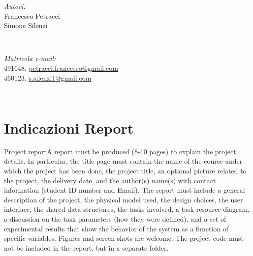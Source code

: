 \begin{titlepage}
	\vspace*{2 cm}
	\begin{minipage}{0.48\textwidth}
		\begin{flushleft}
			\textit{Autori:}\\
			Francesco Petracci\\
			Simone Silenzi
		\end{flushleft}
	\end{minipage}~
	\begin{minipage}{0.48\textwidth}
		\begin{flushright}
			\textit{Matricola e-mail:}\\		
			491648, \href{mailto:petracci.francesco@gmail.com}{petracci.francesco@gmail.com} \\
			460123, \href{mailto:s.silenzi1@gmail.com}{s.silenzi1@gmail.com}
		\end{flushright}
	\end{minipage}\\[2 cm]
	
	
	
\end{titlepage}
\newpage

\section{Indicazioni Report}
Project reportA  report  must  be  produced  (8-10  pages)  to  explain  the  project  details.  In  particular,  the  title  page  must  contain  the  name  of  the  course  under  which  the  project  has  been  done,  the  project  title,  an  optional  picture related  to  the  project,  the  delivery  date,  and the  author(s)  name(s)  with  contact  information (student ID number and Email). The  report  must  include  a  general  description  of  the  project,  the  physical  model  used,  the  design  choices, the user interface, the shared data structures, the tasks involved, a task-resource diagram, a discussion  on  the  task  parameters  (how they  were  defined),  and  a  set  of  experimental  results  that show  the  behavior  of  the  system  as  a  function  of  specific  variables.  Figures  and  screen  shots  are  welcome. The project code must not be included in the report, but in a separate folder.
 
